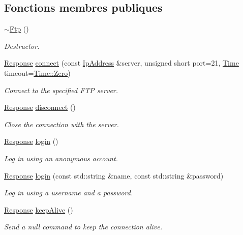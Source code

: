 \subsection*{Fonctions membres publiques}
\begin{DoxyCompactItemize}
\item 
\hyperlink{classsf_1_1Ftp_a2edfa8e9009caf27bce74459ae76dc52}{$\sim$\+Ftp} ()
\begin{DoxyCompactList}\small\item\em Destructor. \end{DoxyCompactList}\item 
\hyperlink{classsf_1_1Ftp_1_1Response}{Response} \hyperlink{classsf_1_1Ftp_af02fb3de3f450a50a27981961c69c860}{connect} (const \hyperlink{classsf_1_1IpAddress}{Ip\+Address} \&server, unsigned short port=21, \hyperlink{classsf_1_1Time}{Time} timeout=\hyperlink{classsf_1_1Time_a8db127b632fa8da21550e7282af11fa0}{Time\+::\+Zero})
\begin{DoxyCompactList}\small\item\em Connect to the specified F\+TP server. \end{DoxyCompactList}\item 
\hyperlink{classsf_1_1Ftp_1_1Response}{Response} \hyperlink{classsf_1_1Ftp_acf7459926f3391cd06bf84337ed6a0f4}{disconnect} ()
\begin{DoxyCompactList}\small\item\em Close the connection with the server. \end{DoxyCompactList}\item 
\hyperlink{classsf_1_1Ftp_1_1Response}{Response} \hyperlink{classsf_1_1Ftp_a686262bc377584cd50e52e1576aa3a9b}{login} ()
\begin{DoxyCompactList}\small\item\em Log in using an anonymous account. \end{DoxyCompactList}\item 
\hyperlink{classsf_1_1Ftp_1_1Response}{Response} \hyperlink{classsf_1_1Ftp_a99d8114793c1659e9d51d45cecdcd965}{login} (const std\+::string \&name, const std\+::string \&password)
\begin{DoxyCompactList}\small\item\em Log in using a username and a password. \end{DoxyCompactList}\item 
\hyperlink{classsf_1_1Ftp_1_1Response}{Response} \hyperlink{classsf_1_1Ftp_aa1127d442b4acb2105aa8060a39d04fc}{keep\+Alive} ()
\begin{DoxyCompactList}\small\item\em Send a null command to keep the connection alive. \end{DoxyCompactList}\item 

\end{DoxyCompactItemize}
